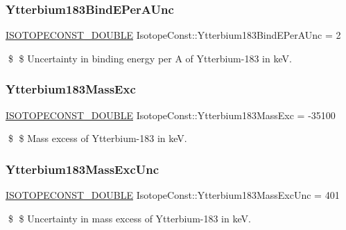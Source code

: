 \subsubsection{\texorpdfstring{Ytterbium183\+Bind\+E\+Per\+A\+Unc}{Ytterbium183BindEPerAUnc}}
{\footnotesize\ttfamily \mbox{\hyperlink{group___isotope_const-_macros_ga8f45a7272ce02c0b4c65c44636ed719a}{I\+S\+O\+T\+O\+P\+E\+C\+O\+N\+S\+T\+\_\+\+D\+O\+U\+B\+LE}} Isotope\+Const\+::\+Ytterbium183\+Bind\+E\+Per\+A\+Unc = 2}

\$ \$ Uncertainty in binding energy per A of Ytterbium-\/183 in keV. \mbox{\label{group___isotope_const-_ytterbium-_yb183_gabc5805ba17156e7b3b5dff13d9fcd946}} 
\subsubsection{\texorpdfstring{Ytterbium183\+Mass\+Exc}{Ytterbium183MassExc}}
{\footnotesize\ttfamily \mbox{\hyperlink{group___isotope_const-_macros_ga8f45a7272ce02c0b4c65c44636ed719a}{I\+S\+O\+T\+O\+P\+E\+C\+O\+N\+S\+T\+\_\+\+D\+O\+U\+B\+LE}} Isotope\+Const\+::\+Ytterbium183\+Mass\+Exc = -\/35100}

\$ \$ Mass excess of Ytterbium-\/183 in keV. \mbox{\label{group___isotope_const-_ytterbium-_yb183_ga5d418499a9c7c81e3e7b04a49d10ccd2}} 
\subsubsection{\texorpdfstring{Ytterbium183\+Mass\+Exc\+Unc}{Ytterbium183MassExcUnc}}
{\footnotesize\ttfamily \mbox{\hyperlink{group___isotope_const-_macros_ga8f45a7272ce02c0b4c65c44636ed719a}{I\+S\+O\+T\+O\+P\+E\+C\+O\+N\+S\+T\+\_\+\+D\+O\+U\+B\+LE}} Isotope\+Const\+::\+Ytterbium183\+Mass\+Exc\+Unc = 401}

\$ \$ Uncertainty in mass excess of Ytterbium-\/183 in keV. \mbox{\label{group___isotope_const-_ytterbium-_yb183_ga204c39fe0a41703b62b29cb77ce6e060}} 

